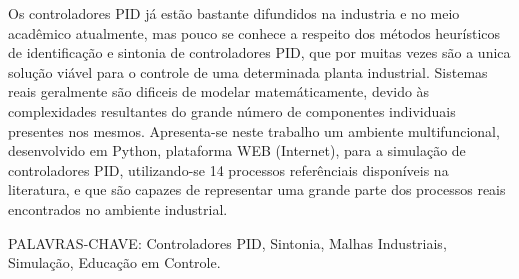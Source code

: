 \begin{resumo}

    Os controladores \acs{PID} já estão bastante difundidos na industria e no
    meio acadêmico atualmente, mas pouco se conhece a respeito dos métodos
    heurísticos de identificação e sintonia de controladores \acs{PID},
    que por muitas vezes são a unica solução viável para o controle de
    uma determinada planta industrial. Sistemas reais geralmente são dificeis
    de modelar matemáticamente, devido às complexidades resultantes do
    grande número de componentes individuais presentes nos mesmos. Apresenta-se
    neste trabalho um ambiente multifuncional, desenvolvido em Python,
    plataforma WEB (Internet), para a simulação de controladores \acs{PID},
    utilizando-se 14 processos referênciais disponíveis na literatura, e
    que são capazes de representar uma grande parte dos processos reais
    encontrados no ambiente industrial.

    PALAVRAS-CHAVE: Controladores PID, Sintonia, Malhas Industriais,
    Simulação, Educação em Controle.

\end{resumo}
